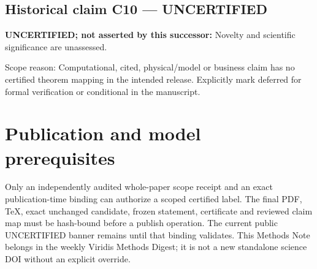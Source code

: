 \documentclass[11pt]{article}
\begin{document}
\subsection*{Historical claim C10 --- UNCERTIFIED}
\textbf{UNCERTIFIED; not asserted by this successor:} Novelty and scientific significance are unassessed.
\par Scope reason: Computational, cited, physical/model or business claim has no certified theorem mapping in the intended release. Explicitly mark deferred for formal verification or conditional in the manuscript.
\section*{Publication and model prerequisites}
Only an independently audited whole-paper scope receipt and an exact publication-time binding can authorize a scoped certified label. The final PDF, TeX, exact unchanged candidate, frozen statement, certificate and reviewed claim map must be hash-bound before a publish operation. The current public UNCERTIFIED banner remains until that binding validates. This Methods Note belongs in the weekly Viridis Methods Digest; it is not a new standalone science DOI without an explicit override.
\end{document}
